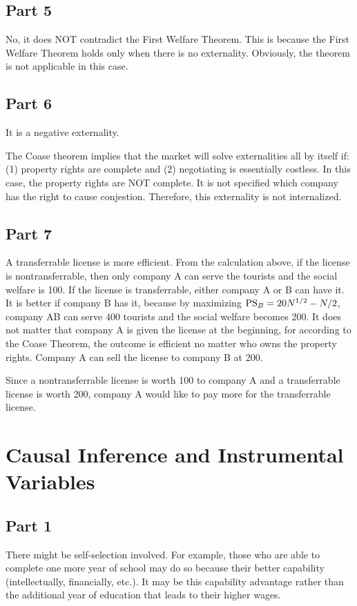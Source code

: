 \documentclass{article}
\begin{document}
\subsection{Part 5}
No, it does NOT contradict the First Welfare Theorem. This is because the First Welfare Theorem holds only when there is no externality. Obviously, the theorem is not applicable in this case.

\subsection{Part 6}
It is a negative externality.

The Coase theorem implies that the market will solve externalities all by itself if: (1) property rights are complete and (2) negotiating is essentially costless. In this case, the property rights are NOT complete. It is not specified which company has the right to cause conjestion. Therefore, this externality is not internalized.

\subsection{Part 7}
A transferrable license is more efficient. From the calculation above, if the license is nontransferrable, then only company A can serve the tourists and the social welfare is 100. If the license is transferrable, either company A or B can have it. It is better if company B has it, because by maximizing $\textup{PS}_B=20N^{1/2}-N/2$, company AB can serve 400 tourists and the social welfare becomes 200. It does not matter that company A is given the license at the beginning, for according to the Coase Theorem, the outcome is efficient no matter who owns the property rights. Company A can sell the license to company B at 200.

Since a nontransferrable license is worth 100 to company A and a transferrable license is worth 200, company A would like to pay more for the transferrable license.

\section{Causal Inference and Instrumental Variables}
\subsection{Part 1}
There might be self-selection involved. For example, those who are able to complete one more year of school may do so because their better capability (intellectually, financially, etc.). It may be this capability advantage rather than the additional year of education that leads to their higher wages.
\end{document}
